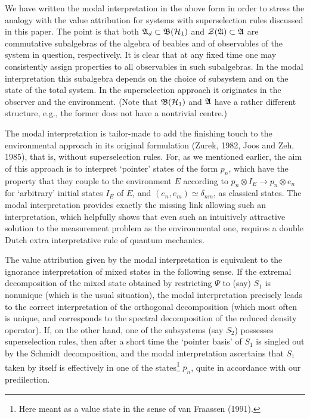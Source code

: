 \documentclass[12pt,titlepage]{article}
\newcommand{\dl}{\delta}
\newcommand{\raw}{\rightarrow}
\newcommand{\A}{\frak A}
\newcommand{\B}{\frak B}
\renewcommand{\H}{\mbox{$\cal H$}}
\newcommand{\fn}{\footnote}
\newcommand{\ot}{\otimes}
\newcommand{\Z}{{\cal Z}}
\begin{document}
We have written the modal interpretation in the above form in order to stress
the analogy with the
value attribution for systems with superselection rules discussed in this
paper. The point is that
both $\A_d\subset \B(\H_1)$ and $\Z(\A)\subset\A$ are commutative subalgebras
of the algebra of
beables and of observables of the system in question, respectively. It is clear
that at any fixed
time one may consistently assign properties to all observables in such
subalgebras.
In the modal interpretation  this subalgebra depends on the choice of subsystem
and on
the state of the total system. In the superselection approach it originates in
the observer and the
environment. (Note that $\B(\H_1)$ and $\A$ have a rather different structure,
e.g.,
the former does not have a
nontrivial centre.)

The modal interpretation  is tailor-made to add the finishing touch to
the environmental approach in its original formulation (Zurek, 1982, Joos and
Zeh, 1985), that is,
without superselection rules. For, as we mentioned earlier, the aim of this
approach is to interpret
`pointer' states of the form $p_n$, which have the property that they couple to
the environment $E$
according to $p_n\ot I_E\raw p_n\ot e_n$ for `arbitrary' initial states $I_E$
of $E$, and
$(e_n,e_m)\simeq \dl_{nm}$, as classical states. The modal interpretation
provides exactly the
missing link allowing such an interpretation, which helpfully shows that even
such an intuitively
attractive solution to the measurement problem as the  environmental one,
requires a double Dutch
extra interpretative rule of quantum mechanics.

The value attribution given by the modal interpretation is equivalent to  the
ignorance interpretation
of mixed states in the following sense.
If the extremal decomposition of the mixed state obtained by restricting $\Psi$
to (say) $S_1$ is
nonunique (which is the usual situation), the
 modal interpretation precisely leads to the correct interpretation of the
orthogonal decomposition
(which most often is unique, and corresponds to the spectral decomposition of
the reduced density
operator). If, on the other hand,  one of the subsystems (say $S_2$) possesses
superselection rules,
then after a short  time the `pointer basis' of $S_1$ is singled out by the
Schmidt decomposition,
and the modal interpretation ascertains that $S_1$ taken by itself is
effectively in one of the
states\fn{Here meant as a value state in the sense of van Fraassen (1991).}
$p_n$, quite in accordance with our predilection.
\end{document}
